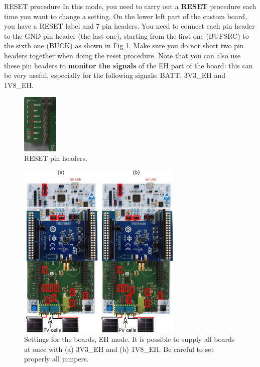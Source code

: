 \begin{bclogo}[couleur = gray!20, arrondi = 0.2, logo=\bcattention]{RESET procedure}
In this mode, you need to carry out a \textbf{RESET} procedure each time you want to change a setting. On the lower left part of the custom board, you have a RESET label and 7 pin headers. You need to connect each pin header to the GND pin header (the last one), starting from the first one (BUFSRC) to the sixth one (BUCK) as shown in Fig \ref{fig:reset-procedure}. Make sure you do not short two pin headers together when doing the reset procedure. Note that you can also use these pin headers to \textbf{monitor the signals} of the EH part of the board: this can be very useful, especially for the following signals: BATT, 3V3\_EH and 1V8\_EH.
\end{bclogo}

\begin{figure}[h!]
    \centering
    \includegraphics[width=0.15\textwidth]{figs/reset-procedure.png}
    \caption{RESET pin headers.}
    \label{fig:reset-procedure}
\end{figure}

\begin{figure}[h!]
    \centering
    \includegraphics[width=0.7\textwidth]{figs/settings-mode-eh.png}
    \caption{Settings for the boards, EH mode. It is possible to supply all boards at once with (a) 3V3\_EH and (b) 1V8\_EH. Be careful to set properly all jumpers.}
    \label{fig:settings-mode-eh}
\end{figure}


